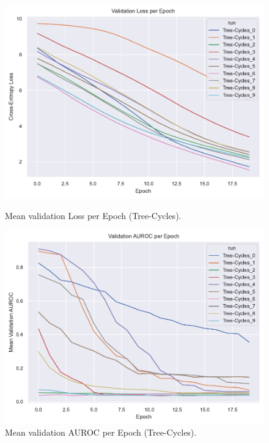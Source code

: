 \begin{figure}[htbp]
    \centering
    \begin{minipage}{0.48\textwidth}
        \centering
        \includegraphics[width=\textwidth]{img/plots/val_loss_plot.pdf}  %
        \caption{Mean validation Loss per Epoch (Tree-Cycles).}
        \label{fig:Tree-Cycles-val_loss}
    \end{minipage}
    \hfill
    \begin{minipage}{0.48\textwidth}
        \centering
        \includegraphics[width=\textwidth]{img/plots/val_auroc_plot.pdf}  %
        \caption{Mean validation AUROC per Epoch (Tree-Cycles).}
        \label{fig:Tree-Cycles-val_auroc}
    \end{minipage}
\end{figure}

